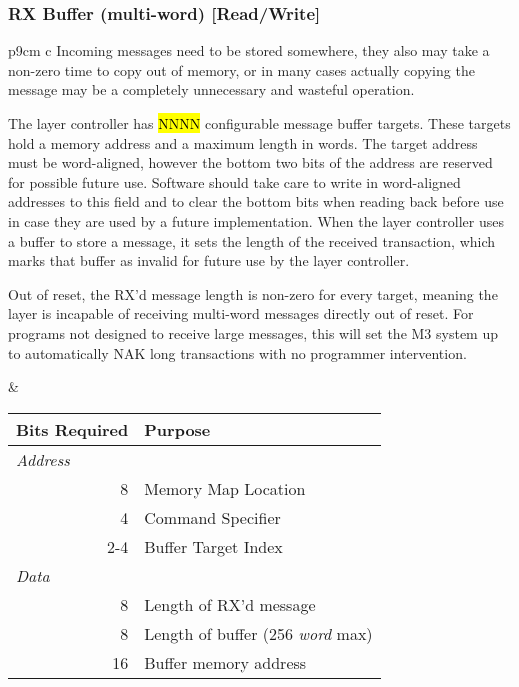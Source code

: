 \subsubsection{RX Buffer (multi-word) [Read/Write]}
\label{reg-rx-multi}
\begin{tabular}{p{9cm} c}
\vspace{-6em}
Incoming messages need to be stored somewhere, they also may take a non-zero
time to copy out of memory, or in many cases actually copying the message may
be a completely unnecessary and wasteful operation.

The layer controller has \hl{NNNN} configurable message buffer targets. These
targets hold a memory address and a maximum length in words. The target
address must be word-aligned, however the bottom two bits of the address are
reserved for possible future use. Software should take care to write in
word-aligned addresses to this field and to clear the bottom bits when reading
back before use in case they are used by a future implementation. When the
layer controller uses a buffer to store a message, it sets the length of the
received transaction, which marks that buffer as invalid for future use by the
layer controller.

Out of reset, the RX'd message length is non-zero for every target, meaning
the layer is incapable of receiving multi-word messages directly out of reset.
For programs not designed to receive large messages, this will set the M3
system up to automatically NAK long transactions with no programmer
intervention.

&

\begin{tabular}{r l}
  Bits Required & Purpose \\
  \hline
  \hline
  \multicolumn{1}{l}{\em Address} & \\
  8 & \bus Memory Map Location \\
  4 & Command Specifier \\
  2-4 & Buffer Target Index \\
  \multicolumn{1}{l}{\em Data} & \\
  8 & Length of RX'd message \\
  8 & Length of buffer (256 {\em word} max) \\
  16 & Buffer memory address \\
\end{tabular}

\\
\end{tabular}

